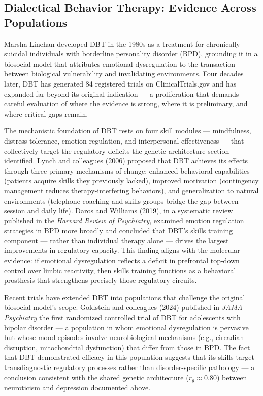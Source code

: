 \subsection*{Dialectical Behavior Therapy: Evidence Across Populations}

Marsha Linehan developed DBT in the 1980s as a treatment for chronically
suicidal individuals with borderline personality disorder (BPD), grounding it in
a biosocial model that attributes emotional dysregulation to the transaction
between biological vulnerability and invalidating environments.\cite{crowell2009}
Four decades later, DBT has generated 84 registered trials on
ClinicalTrials.gov\cite{clinicaltrials2024} and has expanded far beyond its original indication —
a proliferation that demands careful evaluation of where the evidence is
strong, where it is preliminary, and where critical gaps remain.

The mechanistic foundation of DBT rests on four skill modules — mindfulness,
distress tolerance, emotion regulation, and interpersonal effectiveness — that
collectively target the regulatory deficits the genetic architecture section
identified.\cite{linehan1993}
Lynch and colleagues (2006) proposed that DBT achieves its effects through
three primary mechanisms of change: enhanced behavioral capabilities (patients
acquire skills they previously lacked), improved motivation (contingency
management reduces therapy-interfering behaviors), and generalization to
natural environments (telephone coaching and skills groups bridge the gap
between session and daily life).\cite{lynch2006}
Daros and Williams (2019), in a systematic review published in the
\emph{Harvard Review of Psychiatry}, examined emotion regulation strategies
in BPD more broadly and concluded that DBT's skills training component — rather
than individual therapy alone — drives the largest improvements in regulatory
capacity.\cite{daros2019}
This finding aligns with the molecular evidence: if emotional dysregulation
reflects a deficit in prefrontal top-down control over limbic reactivity,
then skills training functions as a behavioral prosthesis that strengthens
precisely those regulatory circuits.

Recent trials have extended DBT into populations that challenge the original
biosocial model's scope.
Goldstein and colleagues (2024) published in \emph{JAMA Psychiatry} the first
randomized controlled trial of DBT for adolescents with bipolar disorder —
a population in whom emotional dysregulation is pervasive but whose mood
episodes involve neurobiological mechanisms (e.g., circadian disruption,
mitochondrial dysfunction) that differ from those in BPD.\cite{goldstein2024}
The fact that DBT demonstrated efficacy in this population suggests that its
skills target transdiagnostic regulatory processes rather than
disorder-specific pathology — a conclusion consistent with the shared genetic
architecture ($r_g \approx 0.80$) between neuroticism and depression documented
above.

